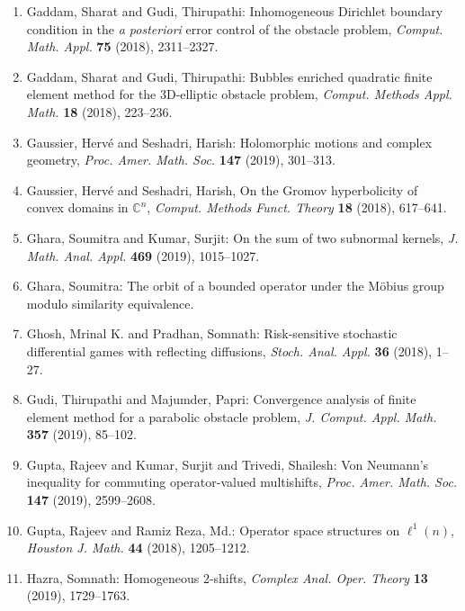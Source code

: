 \begin{enumerate}[leftmargin=27pt]
	\item Gaddam, Sharat and Gudi, Thirupathi: Inhomogeneous {D}irichlet boundary condition in the {\it a
			      posteriori} error control of the obstacle problem, {\em Comput. Math. Appl.} {\bf 75} (2018), 2311--2327.

	\item Gaddam, Sharat and Gudi, Thirupathi: Bubbles enriched quadratic finite element method for the
	      3{D}-elliptic obstacle problem, {\em Comput. Methods Appl. Math.} {\bf 18} (2018), 223--236.

	\item Gaussier, Herv\'{e} and Seshadri, Harish: Holomorphic motions and complex geometry,
	      {\em Proc. Amer. Math. Soc.} {\bf 147} (2019), 301--313.

	\item Gaussier, Herv\'{e} and Seshadri, Harish, On the {G}romov hyperbolicity of convex domains in {$\mathbb
				      C^n$}, {\em Comput. Methods Funct. Theory} {\bf 18} (2018), 617--641.

	\item Ghara, Soumitra and Kumar, Surjit: On the sum of two subnormal kernels, {\em J. Math. Anal. Appl.}
		      {\bf 469} (2019), 1015--1027.

	\item Ghara, Soumitra: The orbit of a bounded operator under the M{\"o}bius group modulo similarity equivalence.

	\item Ghosh, Mrinal K. and Pradhan, Somnath: Risk-sensitive stochastic differential games with reflecting
	      diffusions, {\em Stoch. Anal. Appl.} {\bf 36} (2018), 1--27.

	\item Gudi, Thirupathi and Majumder, Papri: Convergence analysis of finite element method for a parabolic
	      obstacle problem, {\em J. Comput. Appl. Math.} {\bf 357} (2019), 85--102.

	\item Gupta, Rajeev and Kumar, Surjit and Trivedi, Shailesh: Von {N}eumann's inequality for commuting
	      operator-valued multishifts, {\em Proc. Amer. Math. Soc.} {\bf 147} (2019), 2599--2608.

	\item Gupta, Rajeev and Ramiz Reza, Md.: Operator space structures on {$\ell^1(n)$}, {\em Houston J. Math.}
		      {\bf 44} (2018), 1205--1212.

	\item Hazra, Somnath: Homogeneous 2-shifts, {\em Complex Anal. Oper. Theory} {\bf 13} (2019), 1729--1763.


\end{enumerate}
